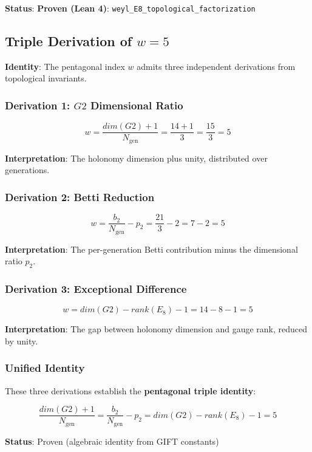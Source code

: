 \documentclass[11pt,a4paper]{article}
\newcommand{\E}{\mathrm{E}}
\newcommand{\Gtwo}{\mathrm{G}_2}
\newcommand{\dimE}{\mathrm{dim}}
\newcommand{\rk}{\mathrm{rank}}
\newcommand{\proven}{\textsc{Proven}}
\def\Gtwo{G2}%
\def\E{E}%
\def\dimE{dim}%
\def\rk{rank}%
\def\proven{Proven}%
\begin{document}
\textbf{Status}: \textbf{\proven{} (Lean 4)}: \texttt{weyl\_E8\_topological\_factorization}

\subsection{Triple Derivation of $w = 5$}

\textbf{Identity}: The pentagonal index $w$ admits three independent derivations from topological invariants.

\subsubsection{Derivation 1: $\Gtwo$ Dimensional Ratio}

$$w = \frac{\dimE(\Gtwo) + 1}{N_{\mathrm{gen}}} = \frac{14 + 1}{3} = \frac{15}{3} = 5$$

\textbf{Interpretation}: The holonomy dimension plus unity, distributed over generations.

\subsubsection{Derivation 2: Betti Reduction}

$$w = \frac{b_2}{N_{\mathrm{gen}}} - p_2 = \frac{21}{3} - 2 = 7 - 2 = 5$$

\textbf{Interpretation}: The per-generation Betti contribution minus the dimensional ratio $p_2$.

\subsubsection{Derivation 3: Exceptional Difference}

$$w = \dimE(\Gtwo) - \rk(\E_8) - 1 = 14 - 8 - 1 = 5$$

\textbf{Interpretation}: The gap between holonomy dimension and gauge rank, reduced by unity.

\subsubsection{Unified Identity}

These three derivations establish the \textbf{pentagonal triple identity}:

$$\boxed{\frac{\dimE(\Gtwo) + 1}{N_{\mathrm{gen}}} = \frac{b_2}{N_{\mathrm{gen}}} - p_2 = \dimE(\Gtwo) - \rk(\E_8) - 1 = 5}$$

\textbf{Status}: \proven{} (algebraic identity from GIFT constants)
\end{document}

